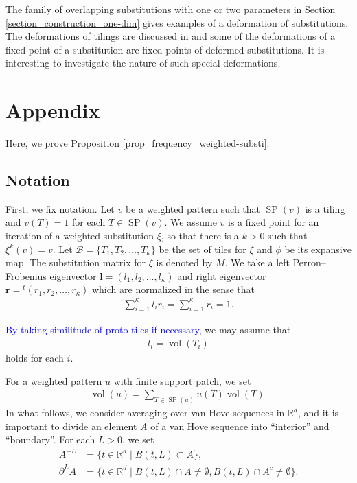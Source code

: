 \documentclass[a4]{amsart}
\DeclareMathOperator{\vol}{vol}
\DeclareMathOperator{\SP}{SP}
\theoremstyle{definition}
\begin{document}
The family of overlapping substitutions with one or two parameters in Section \ref{section_construction_one-dim}
gives examples of a deformation of substitutions.
The deformations of tilings are discussed in \cite{Clark-Sadun}
and some of the deformations of
a fixed point of a substitution
are fixed points of deformed substitutions. It is interesting
to investigate the nature of such special deformations.

\section{Appendix}\label{appendix}
Here, we prove Proposition \ref{prop_frequency_weighted-substi}.
\subsection{Notation}
First, we fix notation.  Let $v$ be a weighted pattern such that $\SP(v)$ is a tiling and
$v(T)=1$ for each $T\in\SP(v)$. We assume $v$ is a fixed point for an iteration of a weighted
substitution $\xi$, so that there is a $k>0$ such that
$\xi^k(v)=v$. Let $\mathcal{B}=\{T_1,T_2,\ldots ,T_{\kappa}\}$ be the set of tiles for $\xi$ and
$\phi$ be its expansive map. The substitution matrix for $\xi$ is denoted by $M$.
We take a left Perron--Frobenius eigenvector $\mathbf{l}=(l_1,l_2,\ldots ,l_{\kappa})$ and
right eigenvector $\mathbf{r}={}^t(r_1,r_2,\ldots ,r_{\kappa})$ which are normalized in the sense
that
\begin{align*}
 \sum_{i=1}^{\kappa}l_ir_i=\sum_{i=1}^{\kappa}r_i=1.
\end{align*}

\textcolor{blue}{By taking similitude of proto-tiles if necessary, }we may assume that
\begin{align*}
 l_i=\vol(T_i)
\end{align*}
holds for each $i$.


For a weighted pattern $u$ with finite support patch, we set
\begin{align*}
 \vol(u)=\sum_{T\in\SP(u)}u(T)\vol(T).
\end{align*}
In what follows, we consider averaging over van Hove sequences in $\mathbb{R}^d$, 
and it is important
to divide an element $A$ of a van Hove sequence into ``interior'' and ``boundary''.
For each $L>0$, we set
\begin{align*}
 A^{-L}&=\{t\in\mathbb{R}^d\mid B(t,L)\subset A\},\\
\partial^LA&=\{t\in\mathbb{R}^d\mid B(t,L)\cap A\neq\emptyset, B(t,L)\cap A^c\neq\emptyset\}.
\end{align*}
\end{document}

